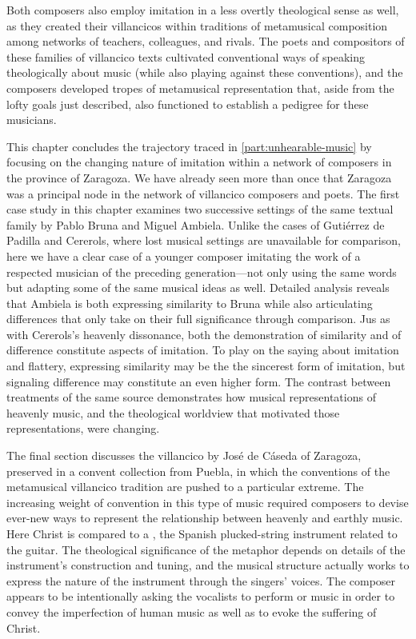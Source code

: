 Both composers also employ imitation in a less overtly theological sense as
well, as they created their villancicos within traditions of metamusical
composition among networks of teachers, colleagues, and rivals. 
The poets and compositors of these families of villancico texts cultivated
conventional ways of speaking theologically about music (while also playing
against these conventions), and the composers developed tropes of metamusical
representation that, aside from the lofty goals just described, also functioned
to establish a pedigree for these musicians.

This chapter concludes the trajectory traced in \cref{part:unhearable-music} by
focusing on the changing nature of imitation within a network of composers in
the province of Zaragoza.
We have already seen more than once that Zaragoza was a principal node in the
network of villancico composers and poets.
The first case study in this chapter examines two successive settings of the
same textual family by Pablo Bruna and Miguel Ambiela.
Unlike the cases of Gutiérrez de Padilla and Cererols, where lost
musical settings are unavailable for comparison, here we have a clear case of a
younger composer imitating the work of a respected musician of the preceding
generation---not only using the same words but adapting some of the same musical
ideas as well.
Detailed analysis reveals that Ambiela is both expressing similarity to Bruna
while also articulating differences that only take on their full significance
through comparison.
Jus as with Cererols's heavenly dissonance, both the demonstration of similarity
and of difference constitute aspects of imitation.
To play on the saying about imitation and flattery, expressing similarity may be
the the sincerest form of imitation, but signaling difference may constitute an
even higher form.
The contrast between treatments of the same source demonstrates how musical
representations of heavenly music, and the theological worldview that motivated
those representations, were changing.  

The final section discusses the villancico  by José de
Cáseda of Zaragoza, preserved in a convent collection from Puebla, in which the
conventions of the metamusical villancico tradition are pushed to a particular
extreme.
The increasing weight of convention in this type of music required composers to
devise ever-new ways to represent the relationship between heavenly and earthly
music.
Here Christ is compared to a , the Spanish plucked-string
instrument related to the guitar.
The theological significance of the metaphor depends on details of the
instrument's construction and tuning, and the musical structure actually works
to express the nature of the instrument through the singers' voices.
The composer appears to be intentionally asking the vocalists to perform
 or  music in order to convey the imperfection of
human music as well as to evoke the suffering of Christ.

